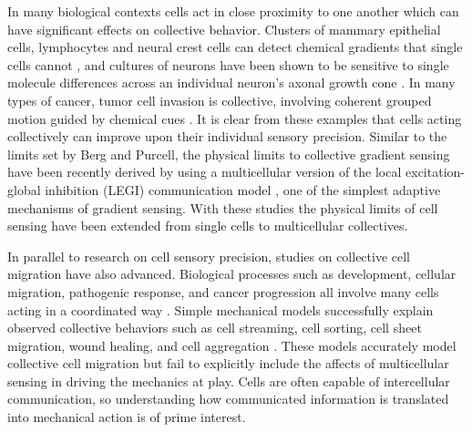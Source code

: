 In many biological contexts cells act in close proximity to one another which can have significant effects on collective behavior. Clusters of mammary epithelial cells, lymphocytes and neural crest cells can detect chemical gradients that single cells cannot \cite{ellison2016cell,malet2015collective,theveneau2010collective}, and cultures of neurons have been shown to be sensitive to single molecule differences across an individual neuron's axonal growth cone \cite{rosoff2004new}.
In many types of cancer, tumor cell invasion is collective, involving coherent grouped motion guided by chemical cues \cite{cheung2013collective, friedl012classifying, aceto2014circulating, puliafito2015three}. It is clear from these examples that cells acting collectively can improve upon their individual sensory precision.
Similar to the limits set by Berg and Purcell, the physical limits to collective gradient sensing have been recently derived \cite{mugler2016limits,ellison2016cell} by using a multicellular version of the local excitation-global inhibition (LEGI) communication model \cite{levchenko2002models}, one of the simplest adaptive mechanisms of gradient sensing. With these studies the physical limits of cell sensing have been extended from single cells to multicellular collectives.

In parallel to research on cell sensory precision, studies on collective cell  migration have also advanced. Biological processes such as development, cellular migration, pathogenic response, and cancer progression all involve many cells acting in a coordinated way \cite{scarpa2016collective,friedl2010plasticity,rasmussen2006quorum,boelens2014exosome,cheung2013collective,vader2014extracellular,szabo2016modelling}. Simple mechanical models successfully explain observed collective behaviors such as cell streaming, cell sorting, cell sheet migration, wound healing, and cell aggregation \cite{kabla2012collective,szabo2010collective,basan2013alignment,janulevicius2015short}. These models accurately model collective cell migration but fail to explicitly include the affects of multicellular sensing in driving the mechanics at play. Cells are often capable of intercellular communication, so understanding how communicated information is translated into mechanical action is of prime interest.

